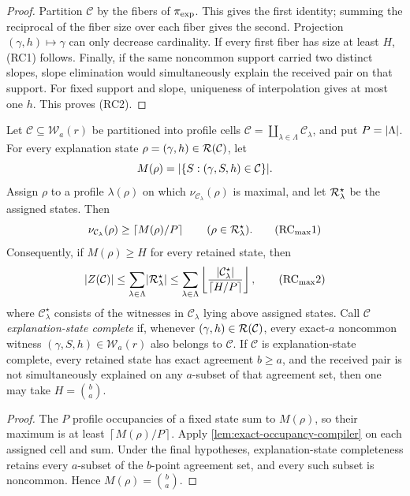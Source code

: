 \documentclass[11pt,a4paper]{amsart}
\numberwithin{equation}{section}
\theoremstyle{remark}
\newcommand{\Ccal}{\mathcal C}\newcommand{\Dcal}{\mathcal D}\newcommand{\Ecal}{\mathcal E}
\newcommand{\Wcal}{\mathcal W}\newcommand{\Xcal}{\mathcal X}\newcommand{\Ycal}{\mathcal Y}
\newcommand{\ceil}[1]{\left\lceil #1\right\rceil}\newcommand{\defeq}{\coloneqq}
\begin{document}
\begin{proof}
Partition \(\Ccal\) by the fibers of \(\pi_{\rm exp}\).  This gives the
first identity; summing the reciprocal of the fiber size over each fiber
gives the second.  Projection \((\gamma,h)\mapsto\gamma\) can only
decrease cardinality.  If every first fiber has size at least \(H\),
\textup{(RC1)} follows.  Finally, if the same noncommon support carried two
distinct slopes, slope elimination would simultaneously explain the
received pair on that support.  For fixed support and slope, uniqueness of
interpolation gives at most one \(h\).  This proves \textup{(RC2)}.
\end{proof}

\begin{lemma}
\label{lem:max-occupancy-addback}
Let \(\Ccal\subseteq\Wcal_a(r)\) be partitioned into profile cells
\(\Ccal=\coprod_{\lambda\in\Lambda}\Ccal_\lambda\), and put
\(P=\lvert \Lambda\rvert\).  For every explanation state
\(\rho=(\gamma,h)\in\Rcal(\Ccal)\), let
\[
 M(\rho)=\abs{\{S:(\gamma,S,h)\in\Ccal\}}.
\]
Assign \(\rho\) to a profile \(\lambda(\rho)\) on which
\(\nu_{\Ccal_\lambda}(\rho)\) is maximal, and let
\(\mathcal R_\lambda^\star\) be the assigned states.  Then
\[
 \nu_{\Ccal_\lambda}(\rho)\ge\ceil{M(\rho)/P}
 \qquad(\rho\in\Rcal_\lambda^\star).               \tag{RC$_{\rm max}$1}
\]
Consequently, if \(M(\rho)\ge H\) for every retained state, then
\[
 \abs{Z(\Ccal)}
 \le\sum_{\lambda\in\Lambda}\abs{\Rcal_\lambda^\star}
 \le\sum_{\lambda\in\Lambda}
   \floor{\frac{\abs{\Ccal_\lambda^\star}}
                   {\ceil{H/P}}},                  \tag{RC$_{\rm max}$2}
\]
where \(\Ccal_\lambda^\star\) consists of the witnesses in
\(\Ccal_\lambda\) lying above assigned states.  Call \(\Ccal\)
\emph{explanation-state complete} if, whenever
\((\gamma,h)\in\Rcal(\Ccal)\), every exact-\(a\) noncommon witness
\((\gamma,S,h)\in\Wcal_a(r)\) also belongs to \(\Ccal\).  If \(\Ccal\)
is explanation-state complete, every retained state has exact agreement
\(b\ge a\), and the received pair is not simultaneously explained on any
\(a\)-subset of that agreement set, then one may take \(H=\binom ba\).
\end{lemma}

\begin{proof}
The \(P\) profile occupancies of a fixed state sum to \(M(\rho)\), so
their maximum is at least \(\ceil{M(\rho)/P}\).  Apply
\cref{lem:exact-occupancy-compiler} on each assigned cell and sum.  Under
the final hypotheses, explanation-state completeness retains every
\(a\)-subset of the \(b\)-point agreement set, and every such subset is
noncommon.  Hence \(M(\rho)=\binom ba\).
\end{proof}
\end{document}
